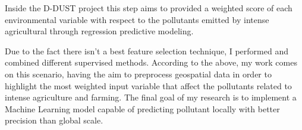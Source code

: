 \bigbreak
Inside the D-DUST project this step aims to provided a weighted score of each environmental variable with respect to the pollutants emitted by intense agricultural through regression predictive modeling.\newline
\par
Due to the fact there isn’t a best feature selection technique, I performed and combined different supervised methods. 
\bigbreak
According to the above, my work comes on this scenario, having the aim to preprocess geospatial data in order to highlight the most weighted input variable that affect the pollutants related to intense agriculture and farming.\newline
The final goal of my research is to implement a Machine Learning model capable of predicting pollutant locally with better precision than global scale. 




